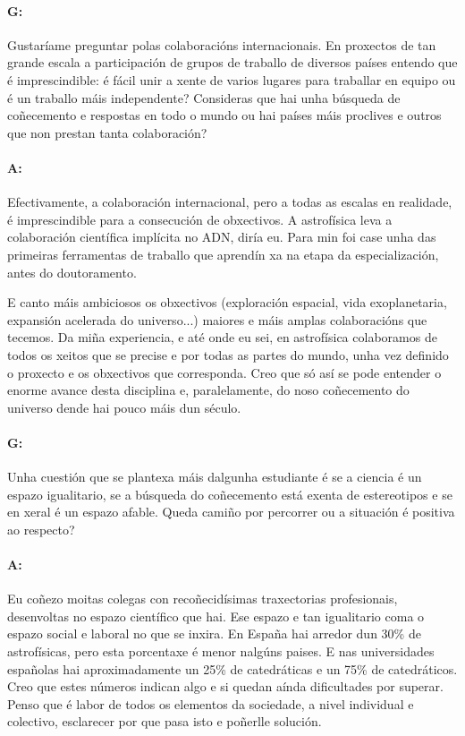 \begin{refsection}
\begin{multicols}{2}
\paragraph{G:} Gustaríame preguntar polas colaboracións internacionais. En
proxectos de tan grande escala a participación de grupos de traballo de
diversos países entendo que é imprescindible: é fácil unir a xente de varios
lugares para traballar en equipo ou é un traballo máis independente? Consideras
que hai unha búsqueda de coñecemento e respostas en todo o mundo ou hai países
máis proclives e outros que non prestan tanta colaboración?

\paragraph{A:} Efectivamente, a colaboración internacional, pero a todas as
escalas en realidade, é imprescindible para a consecución de obxectivos. A
astrofísica leva a colaboración científica implícita no ADN, diría eu. Para min
foi case unha das primeiras ferramentas de traballo que aprendín xa na etapa da
especialización, antes do doutoramento.

E canto máis ambiciosos os obxectivos (exploración espacial, vida
exoplanetaria, expansión acelerada do universo...) maiores e máis amplas
colaboracións que tecemos. Da miña experiencia, e até onde eu sei, en
astrofísica colaboramos de todos os xeitos que se precise e por todas as partes
do mundo, unha vez definido o proxecto e os obxectivos que corresponda. Creo
que só así se pode entender o enorme avance desta disciplina e, paralelamente,
do noso coñecemento do universo dende hai pouco máis dun século.

\paragraph{G:} Unha cuestión que se plantexa máis dalgunha estudiante é se a
ciencia é un espazo igualitario, se a búsqueda do coñecemento está exenta de
estereotipos e se en xeral é un espazo afable. Queda camiño por percorrer ou a
situación é positiva ao respecto?

\paragraph{A:} Eu coñezo moitas colegas con recoñecidísimas traxectorias
profesionais, desenvoltas no espazo científico que hai. Ese espazo e tan
igualitario coma o espazo social e laboral no que se inxira. En España hai
arredor dun 30\% de astrofísicas, pero esta porcentaxe é menor nalgúns paises.
E nas universidades españolas hai aproximadamente un 25\% de catedráticas e un
75\% de catedráticos. Creo que estes números indican algo e si quedan aínda
dificultades por superar. Penso que é labor de todos os elementos da sociedade,
a nivel individual e colectivo, esclarecer por que pasa isto e poñerlle
solución.


\end{multicols}
\end{refsection}
